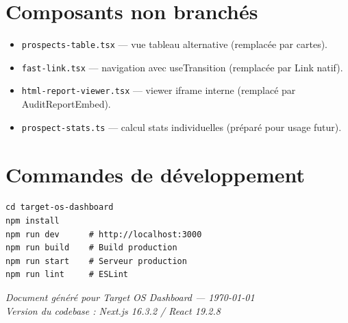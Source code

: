 \documentclass[11pt,a4paper]{report}
\begin{document}
\section{Composants non branchés}

\begin{itemize}[leftmargin=*]
  \item \texttt{prospects-table.tsx} --- vue tableau alternative (remplacée par cartes).
  \item \texttt{fast-link.tsx} --- navigation avec useTransition (remplacée par Link natif).
  \item \texttt{html-report-viewer.tsx} --- viewer iframe interne (remplacé par AuditReportEmbed).
  \item \texttt{prospect-stats.ts} --- calcul stats individuelles (préparé pour usage futur).
\end{itemize}

\section{Commandes de développement}

\begin{lstlisting}
cd target-os-dashboard
npm install
npm run dev      # http://localhost:3000
npm run build    # Build production
npm run start    # Serveur production
npm run lint     # ESLint
\end{lstlisting}

\vfill
\begin{center}
\small
\textit{Document généré pour Target OS Dashboard --- \today}\\
\textit{Version du codebase : Next.js 16.3.2 / React 19.2.8}
\end{center}
\end{document}
